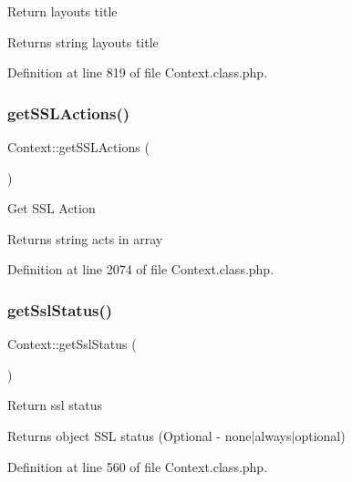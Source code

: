 Return layout\textquotesingle{}s title \begin{DoxyReturn}{Returns}
string layout\textquotesingle{}s title 
\end{DoxyReturn}


Definition at line 819 of file Context.\+class.\+php.

\mbox{\label{classContext_a10b68bdba6f55bc725c352aad7844dc7}} 
\subsubsection{\texorpdfstring{get\+S\+S\+L\+Actions()}{getSSLActions()}}
{\footnotesize\ttfamily Context\+::get\+S\+S\+L\+Actions (\begin{DoxyParamCaption}{ }\end{DoxyParamCaption})}

Get S\+SL Action

\begin{DoxyReturn}{Returns}
string acts in array 
\end{DoxyReturn}


Definition at line 2074 of file Context.\+class.\+php.

\mbox{\label{classContext_a284a60296c1f3df3adbe3395769fa883}} 
\subsubsection{\texorpdfstring{get\+Ssl\+Status()}{getSslStatus()}}
{\footnotesize\ttfamily Context\+::get\+Ssl\+Status (\begin{DoxyParamCaption}{ }\end{DoxyParamCaption})}

Return ssl status

\begin{DoxyReturn}{Returns}
object S\+SL status (Optional -\/ none$\vert$always$\vert$optional) 
\end{DoxyReturn}


Definition at line 560 of file Context.\+class.\+php.

\mbox{\label{classContext_aa60b75d32d4923bb3b9854985a82ce36}} 
